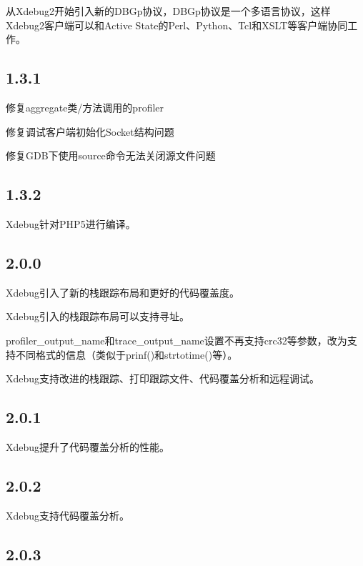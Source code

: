 从Xdebug2开始引入新的DBGp协议，DBGp协议是一个多语言协议，这样Xdebug2客户端可以和Active State的Perl、Python、Tcl和XSLT等客户端协同工作。

\subsection{1.3.1}

\begin{compactitem}
\item 修复aggregate类/方法调用的profiler
\item 修复调试客户端初始化Socket结构问题
\item 修复GDB下使用source命令无法关闭源文件问题
\end{compactitem}



\subsection{1.3.2}

Xdebug针对PHP5进行编译。

\subsection{2.0.0}

\begin{compactitem}
\item Xdebug引入了新的栈跟踪布局和更好的代码覆盖度。
\item Xdebug引入的栈跟踪布局可以支持寻址。
\item profiler\_output\_name和trace\_output\_name设置不再支持crc32等参数，改为支持不同格式的信息（类似于prinf()和strtotime()等）。
\item Xdebug支持改进的栈跟踪、打印跟踪文件、代码覆盖分析和远程调试。
\end{compactitem}



\subsection{2.0.1}

Xdebug提升了代码覆盖分析的性能。

\subsection{2.0.2}


Xdebug支持代码覆盖分析。

\subsection{2.0.3}

